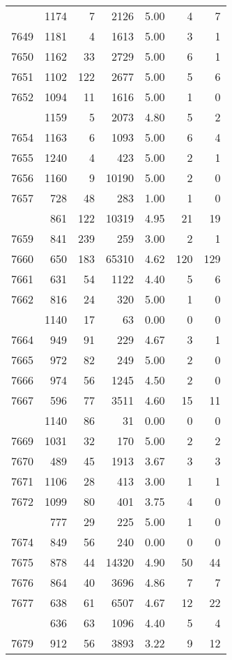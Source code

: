 \documentclass[
]{article}
\begin{document}
\begin{table}
\begin{tabular}[t]{lrrrrrr}
\addlinespace
7648 & 1174 & 7 & 2126 & 5.00 & 4 & 7\\
7649 & 1181 & 4 & 1613 & 5.00 & 3 & 1\\
7650 & 1162 & 33 & 2729 & 5.00 & 6 & 1\\
7651 & 1102 & 122 & 2677 & 5.00 & 5 & 6\\
7652 & 1094 & 11 & 1616 & 5.00 & 1 & 0\\
\addlinespace
7653 & 1159 & 5 & 2073 & 4.80 & 5 & 2\\
7654 & 1163 & 6 & 1093 & 5.00 & 6 & 4\\
7655 & 1240 & 4 & 423 & 5.00 & 2 & 1\\
7656 & 1160 & 9 & 10190 & 5.00 & 2 & 0\\
7657 & 728 & 48 & 283 & 1.00 & 1 & 0\\
\addlinespace
7658 & 861 & 122 & 10319 & 4.95 & 21 & 19\\
7659 & 841 & 239 & 259 & 3.00 & 2 & 1\\
7660 & 650 & 183 & 65310 & 4.62 & 120 & 129\\
7661 & 631 & 54 & 1122 & 4.40 & 5 & 6\\
7662 & 816 & 24 & 320 & 5.00 & 1 & 0\\
\addlinespace
7663 & 1140 & 17 & 63 & 0.00 & 0 & 0\\
7664 & 949 & 91 & 229 & 4.67 & 3 & 1\\
7665 & 972 & 82 & 249 & 5.00 & 2 & 0\\
7666 & 974 & 56 & 1245 & 4.50 & 2 & 0\\
7667 & 596 & 77 & 3511 & 4.60 & 15 & 11\\
\addlinespace
7668 & 1140 & 86 & 31 & 0.00 & 0 & 0\\
7669 & 1031 & 32 & 170 & 5.00 & 2 & 2\\
7670 & 489 & 45 & 1913 & 3.67 & 3 & 3\\
7671 & 1106 & 28 & 413 & 3.00 & 1 & 1\\
7672 & 1099 & 80 & 401 & 3.75 & 4 & 0\\
\addlinespace
7673 & 777 & 29 & 225 & 5.00 & 1 & 0\\
7674 & 849 & 56 & 240 & 0.00 & 0 & 0\\
7675 & 878 & 44 & 14320 & 4.90 & 50 & 44\\
7676 & 864 & 40 & 3696 & 4.86 & 7 & 7\\
7677 & 638 & 61 & 6507 & 4.67 & 12 & 22\\
\addlinespace
7678 & 636 & 63 & 1096 & 4.40 & 5 & 4\\
7679 & 912 & 56 & 3893 & 3.22 & 9 & 12\\

\end{tabular}
\end{table}
\end{document}
